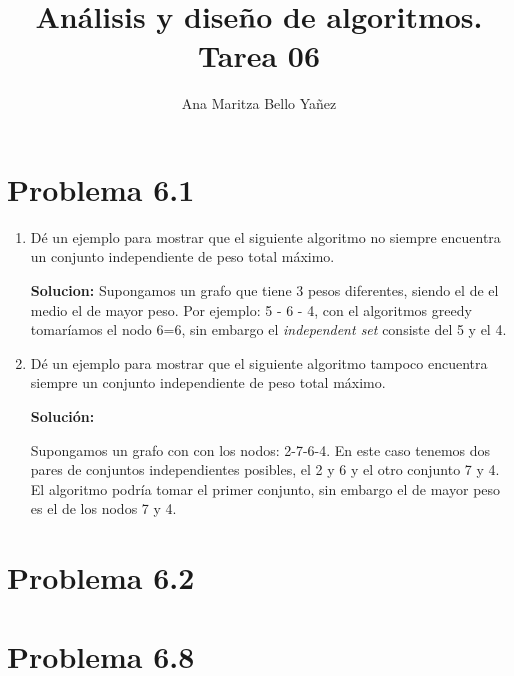 \documentclass{article}
\begin{document}
\title{Análisis y diseño de algoritmos. \\ Tarea 06}
\author{Ana Maritza Bello Yañez}
\maketitle
\setlength{\parindent}{0pt}
\setlength{\parskip}{1em}

\section*{Problema 6.1}
% 
% 
% 
% 

\begin{enumerate}
\item Dé un ejemplo para mostrar que el siguiente algoritmo no siempre encuentra
un conjunto independiente de peso total máximo.

\textbf{Solucion:} Supongamos un grafo que tiene 3 pesos diferentes, siendo el
de el medio el de mayor peso. Por ejemplo: 5 - 6 - 4, con el algoritmos greedy
tomaríamos el nodo 6=6, sin embargo el \textit{independent set} consiste del 5 y
el 4.

\item Dé un ejemplo para mostrar que el siguiente algoritmo tampoco encuentra
siempre un conjunto independiente de peso total máximo.

\textbf{Solución: }

Supongamos un grafo con con los nodos: 2-7-6-4. En este caso tenemos dos pares
de conjuntos independientes posibles, el 2 y 6 y el otro conjunto 7 y 4. El
algoritmo podría tomar el primer conjunto, sin embargo el de mayor peso es el de
los nodos 7 y 4.
\end{enumerate}

\section*{Problema 6.2}

\section*{Problema 6.8}
\end{document}
